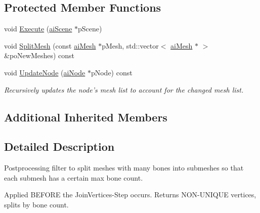 \subsection*{Protected Member Functions}
\begin{DoxyCompactItemize}
\item 
void \hyperlink{class_assimp_1_1_split_by_bone_count_process_a4499ff0f895e8906495e887cd69dbd56}{Execute} (\hyperlink{structai_scene}{ai\+Scene} $\ast$p\+Scene)
\item 
void \hyperlink{class_assimp_1_1_split_by_bone_count_process_a82e19952f0dcf5a4fa65c58183a689d9}{Split\+Mesh} (const \hyperlink{structai_mesh}{ai\+Mesh} $\ast$p\+Mesh, std\+::vector$<$ \hyperlink{structai_mesh}{ai\+Mesh} $\ast$ $>$ \&po\+New\+Meshes) const 
\item 
\hypertarget{class_assimp_1_1_split_by_bone_count_process_af212dbc7955af257af204abcc9302c47}{void \hyperlink{class_assimp_1_1_split_by_bone_count_process_af212dbc7955af257af204abcc9302c47}{Update\+Node} (\hyperlink{structai_node}{ai\+Node} $\ast$p\+Node) const }\label{class_assimp_1_1_split_by_bone_count_process_af212dbc7955af257af204abcc9302c47}

\begin{DoxyCompactList}\small\item\em Recursively updates the node's mesh list to account for the changed mesh list. \end{DoxyCompactList}\end{DoxyCompactItemize}
\subsection*{Additional Inherited Members}


\subsection{Detailed Description}
Postprocessing filter to split meshes with many bones into submeshes so that each submesh has a certain max bone count.

Applied B\+E\+F\+O\+R\+E the Join\+Vertices-\/\+Step occurs. Returns N\+O\+N-\/\+U\+N\+I\+Q\+U\+E vertices, splits by bone count. 

